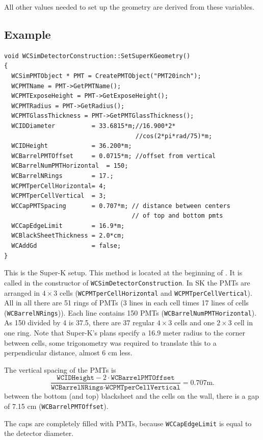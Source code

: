 All other values needed to set up the geometry are derived from these variables.

\subsection{Example}

\begin{lstlisting}
void WCSimDetectorConstruction::SetSuperKGeometry()
{
  WCSimPMTObject * PMT = CreatePMTObject("PMT20inch"); 
  WCPMTName = PMT->GetPMTName();
  WCPMTExposeHeight = PMT->GetExposeHeight();
  WCPMTRadius = PMT->GetRadius();
  WCPMTGlassThickness = PMT->GetPMTGlassThickness();      
  WCIDDiameter          = 33.6815*m;//16.900*2*
                                    //cos(2*pi*rad/75)*m;
  WCIDHeight            = 36.200*m;
  WCBarrelPMTOffset     = 0.0715*m; //offset from vertical
  WCBarrelNumPMTHorizontal  = 150; 
  WCBarrelNRings        = 17.;
  WCPMTperCellHorizontal= 4;
  WCPMTperCellVertical  = 3; 
  WCCapPMTSpacing       = 0.707*m; // distance between centers
                                   // of top and bottom pmts
  WCCapEdgeLimit        = 16.9*m;
  WCBlackSheetThickness = 2.0*cm;
  WCAddGd               = false;
}
\end{lstlisting}

This is the Super-K setup. This method is located at the beginning of . It is called in the constructor of \texttt{WCSimDetectorConstruction}.
In SK the PMTs are arranged in $4 \times 3$ cells (\texttt{WCPMTperCellHorizontal} and \texttt{WCPMTperCellVertical}). 
All in all there are 51 rings of PMTs (3 lines in each cell times 17 lines of cells (\texttt{WCBarrelNRings})). Each line contains 150 PMTs (\texttt{WCBarrelNumPMTHorizontal}). As 150 divided by 4 is 37.5, there are 37 regular $4 \times 3$ cells and one $2 \times 3$ cell in one ring.  Note that Super-K's plans specify a 16.9 meter radius to the corner between cells, some trigonometry was required to translate this to a perpendicular distance, almost 6 cm less.

The vertical spacing of the PMTs is
\[
\frac{\texttt{WCIDHeight} - 2\cdot\texttt{WCBarrelPMTOffset}}
{\texttt{WCBarrelNRings} \cdot \texttt{WCPMTperCellVertical}}
= 0.707 \mathrm{m}.
\]
between the bottom (and top) blacksheet and the cells on the wall, there is a gap of 7.15 cm (\texttt{WCBarrelPMTOffset}).

The caps are completely filled with PMTs, because \texttt{WCCapEdgeLimit} is equal to the detector diameter. 



